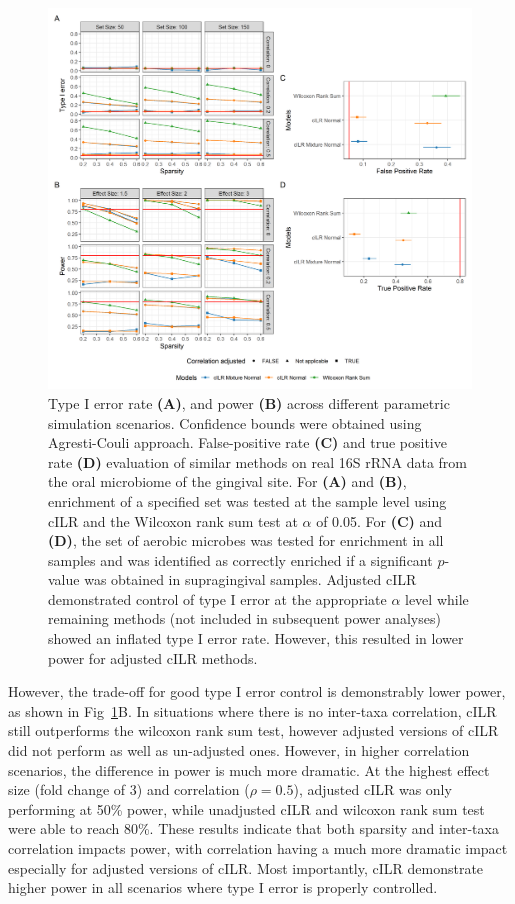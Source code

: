 \documentclass[10pt,letterpaper]{article}
\begin{document}
\begin{figure}[!ht]
    \centering
    \includegraphics[width=\textwidth]{figures/sim_data_ss_hypo.png}
    \caption{Type I error rate \textbf{(A)}, and power \textbf{(B)} across different parametric simulation scenarios. Confidence bounds were obtained using Agresti-Couli \cite{agresti1998} approach. False-positive rate \textbf{(C)} and true positive rate \textbf{(D)} evaluation of similar methods on real 16S rRNA data from the oral microbiome of the gingival site. For \textbf{(A)} and \textbf{(B)}, enrichment of a specified set was tested at the sample level using cILR and the Wilcoxon rank sum test at $\alpha$ of 0.05. For \textbf{(C)} and \textbf{(D)}, the set of aerobic microbes was tested for enrichment in all samples and was identified as correctly enriched if a significant $p$-value was obtained in supragingival samples. Adjusted cILR demonstrated control of type I error at the appropriate $\alpha$ level while remaining methods (not included in subsequent power analyses) showed an inflated type I error rate. However, this resulted in lower power for adjusted cILR methods.}
    \label{fig:2}
\end{figure}

However, the trade-off for good type I error control is demonstrably lower power, as shown in Fig~\ref{fig:2}B. In situations where there is no inter-taxa correlation, cILR still outperforms the wilcoxon rank sum test, however adjusted versions of cILR did not perform as well as un-adjusted ones. However, in higher correlation scenarios, the difference in power is much more dramatic. At the highest effect size (fold change of 3) and correlation ($\rho = 0.5$), adjusted cILR was only performing at 50\% power, while unadjusted cILR and wilcoxon rank sum test were able to reach 80\%. These results indicate that both sparsity and inter-taxa correlation impacts power, with correlation having a much more dramatic impact especially for adjusted versions of cILR. Most importantly, cILR demonstrate higher power in all scenarios where type I error is properly controlled.    
\end{document}
